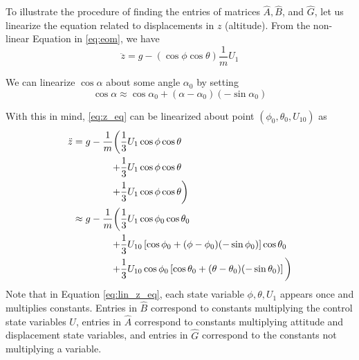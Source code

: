 To illustrate the procedure of finding the entries of matrices $\hat{A}, \hat{B}$, and $\hat{G}$, let us linearize the equation related to displacements in $z$ (altitude). From the non-linear Equation in \eqref{eq:eom}, we have
\begin{equation}\label{eq:z_eq}
\ddot{z} = g - ( \cos\phi \cos\theta)\frac{1}{m}U_1
\end{equation}

We can linearize $\cos \alpha$ about some angle $\alpha_0$ by setting 
\begin{equation}
\cos \alpha \approx \cos \alpha_0 + (\alpha - \alpha_0)(-\sin\alpha_0)
\end{equation}

With this in mind, \eqref{eq:z_eq} can be linearized about point $(\phi_0,\theta_0,U_{10})$ as
\begin{equation}\label{eq:lin_z_eq}
\begin{split}
\ddot{z} = g - \frac{1}{m}\bigg(&\frac{1}{3}U_1 \cos\phi \cos\theta \\
+ &\frac{1}{3}U_1 \cos\phi \cos\theta\\
 + &\frac{1}{3}U_1 \cos\phi \cos\theta\bigg)\\
 \approx g - \frac{1}{m}\bigg(& \frac{1}{3}U_1 \cos\phi_0 \cos\theta_0 \\
 + & \frac{1}{3}U_{10} \left[\cos \phi_0 + (\phi - \phi_0)(-\sin\phi_0)\right] \cos\theta_0 \\
+ & \frac{1}{3}U_{10} \cos\phi_0 \left[\cos \theta_0 + (\theta - \theta_0)(-\sin\theta_0)\right]\bigg)\\
\end{split}
\end{equation}
Note that in Equation \eqref{eq:lin_z_eq}, each state variable $\phi,\theta,U_1$ appears once and multiplies constants. Entries in $\hat{B}$ correspond to constants multiplying the control state variables $U$, entries in $\hat{A}$ correspond to constants multiplying attitude and displacement state variables, and entries in $\hat{G}$ correspond to the constants not multiplying a variable.
